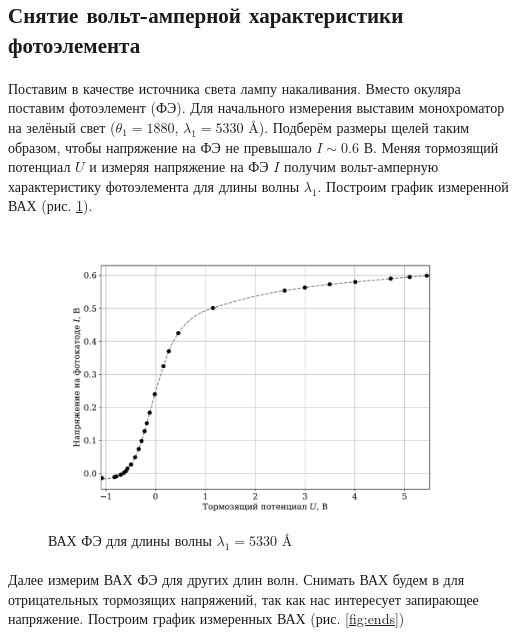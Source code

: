 \documentclass[a4paper,12pt]{article}
\begin{document}
\subsection{Снятие вольт-амперной характеристики фотоэлемента}

\paragraph{} Поставим в качестве источника света лампу накаливания. Вместо окуляра поставим фотоэлемент (ФЭ). Для начального измерения выставим монохроматор на зелёный свет ($\theta_1 = 1880$, $\lambda_1 = 5330$ Å). Подберём размеры щелей таким образом, чтобы напряжение на ФЭ не превышало $I \sim 0.6$ В. Меняя тормозящий потенциал $U$ и измеряя напряжение на ФЭ $I$ получим вольт-амперную характеристику фотоэлемента для длины волны $\lambda_1$. Построим график измеренной ВАХ (рис. \ref{fig:general}).

\begin{figure}[h]
\centering
\includegraphics[width=\textwidth]{plot_general.pdf}
\caption{ВАХ ФЭ для длины волны $\lambda_1 = 5330$ Å}
\label{fig:general}
\end{figure}

\paragraph{} Далее измерим ВАХ ФЭ для других длин волн. Снимать ВАХ будем в для отрицательных тормозящих напряжений, так как нас интересует запирающее напряжение. Построим график измеренных ВАХ (рис. \ref{fig:ends}) 
\end{document}
